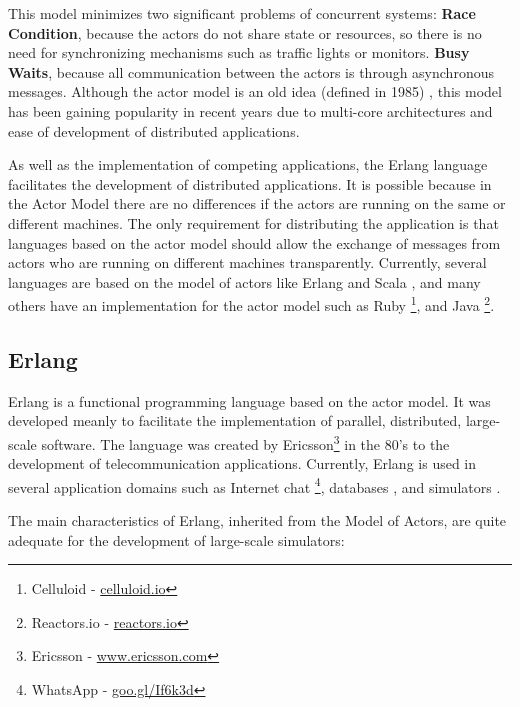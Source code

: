 This model minimizes two significant problems of concurrent systems: \textbf{Race Condition}, because the actors do not share state or resources, so there is no need for synchronizing mechanisms such as traffic lights or monitors. \textbf{Busy Waits}, because all communication between the actors is through asynchronous messages. Although the actor model is an old idea (defined in 1985) \cite {agha1985actors}, this model has been gaining popularity in recent years due to multi-core architectures and ease of development of distributed applications.

As well as the implementation of competing applications, the Erlang language facilitates the development of distributed applications. It is possible because in the Actor Model there are no differences if the actors are running on the same or different machines. The only requirement for distributing the application is that languages based on the actor model should allow the exchange of messages from actors who are running on different machines transparently. Currently, several languages are based on the model of actors like Erlang and Scala \cite{tasharofi2013scala}, and many others have an implementation for the actor model such as Ruby \footnote {Celluloid - \url{celluloid.io}}, and Java \footnote{Reactors.io - \url{reactors.io}}.

\subsection{Erlang}
\label{sub:erlang}

Erlang is a functional programming language based on the actor model. It was developed meanly to facilitate the implementation of parallel, distributed, large-scale software. The language was created by Ericsson\footnote{Ericsson - \url{www.ericsson.com}} in the 80's to the development of telecommunication applications. Currently, Erlang is used in several application domains such as Internet chat \footnote{WhatsApp - \url{goo.gl/If6k3d}}, databases \cite{anderson2010couchdb}, and simulators \cite{song2011performance,toscano2012parallel}.

The main characteristics of Erlang, inherited from the Model of Actors, are quite adequate for the development of large-scale simulators:

